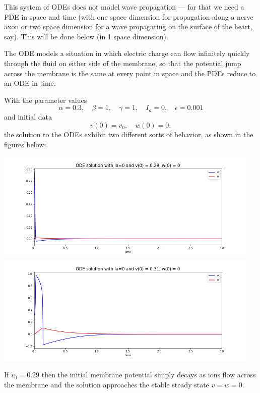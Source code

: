 \documentclass[10pt]{article}
\begin{document}
This system of ODEs does not model wave propagation --- for that we need a
PDE in space and time (with one space dimension for propagation along a
nerve axon or two space dimension for a wave propagating on the surface of the
heart, say).  This will be done below (in 1 space dimension).

The ODE models a situation in which electric charge can flow
infinitely quickly through the fluid on either side of the membrane, so that
the potential jump across the membrane is the same at every point in space
and the PDEs reduce to an ODE in time.  

With the parameter values
\begin{equation}\label{parm1}
\alpha=0.3,\quad \beta = 1,\quad \gamma = 1,\quad I_a=0,\quad \epsilon =
0.001
\end{equation}
and initial data
\begin{equation}\label{ic1}
v(0) = v_0,\quad w(0)=0,
\end{equation} 
the solution to the ODEs  exhibit two different sorts of
behavior, as shown in the figures below:

\hfil\includegraphics[width=5.0in]{v029.png}\hfil
\vskip 5pt
\hfil\includegraphics[width=5.0in]{v031.png}\hfil

\vskip 5pt

If $v_0=0.29$ then the initial membrane potential simply decays as ions flow
across the membrane and the solution approaches the stable steady state
$v=w=0$.
\end{document}
